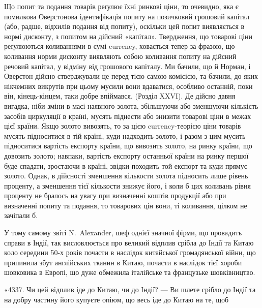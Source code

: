 Що попит та подання товарів реґулює їхні ринкові ціни, то очевидно, яка
є помилкова Оверстонова ідентифікація попиту на позичковий грошовий капітал
(або, радше, відхилів подання від попиту), оскільки цей попит виявляється
в нормі дисконту, з попитом на дійсний «капітал». Твердження, що товарові
ціни реґулюються коливаннями в сумі currency, ховається тепер за фразою, що
коливання норми дисконту виявляють собою коливання попиту на дійсний речовий
капітал, у відміну від грошового капіталу. Ми бачили, що й Норман, і
Оверстон дійсно стверджували це перед тією самою комісією, та бачили, до яких
нікчемних викрутів при цьому мусили вони вдаватися, особливо останній, поки
він, кінець-кінцем, таки добре впіймався. (Розділ XXVI). Де дійсно давня вигадка,
ніби зміни в масі наявного золота, збільшуючи або зменшуючи кількість
засобів циркуляції в країні, мусять піднести або знизити товарові ціни в межах
цієї країни. Якщо золото вивозять, то за цією currency-теорією ціни товарів
мусять підноситися в тій країні, куди надходить золото, і разом з цим мусить
підноситися вартість експорту країни, що вивозить золото, на ринку країни, що
довозить золото; навпаки, вартість експорту останньої країни на ринку першої
буде спадати, зростаючи в країні, звідки походить той експорт та куди прямує
золото. Однак, в дійсності зменшення кількости золота підносить лише рівень проценту,
а зменшення тієї кількости знижує його, і коли б цих коливань рівня проценту
не бралось на увагу при визначенні коштів продукції або при визначенні
попиту та подання, то товарових цін вони, ті коливання, цілком не зачіпали б.

У тому самому звіті N.~Alexander, шеф однієї значної фірми, що провадить
справи в Індії, так висловлюється про великий відплив срібла до Індії та Китаю
коло середини 50-х років почасти в наслідок китайської громадянської війни, що
припинила збут англійських тканин в Китаю, почасти в наслідок тієї хороби
шовковика в Европі, що дуже обмежила італійське та французьке шовківництво.

«4337. Чи цей відплив іде до Китаю, чи до Індії? — Ви шлете срібло до
Індії та на добру частину його купуєте опіюм, що весь іде до Китаю на те, щоб
\parbreak{}  %

